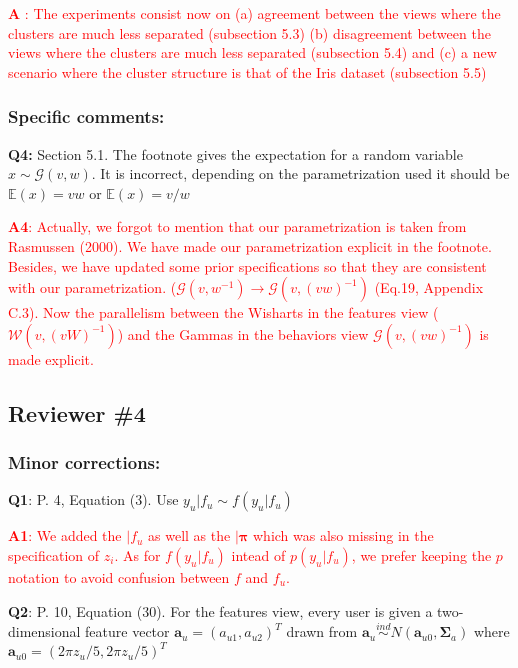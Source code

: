 \documentclass[]{article}
\newcommand\done[1]{\textcolor{red}{#1}}
\begin{document}
	\done{
		\textbf{A} : The experiments consist now on (a) agreement between the views where the clusters are much less separated (subsection 5.3) (b) disagreement between the views where the clusters are much less separated (subsection 5.4) and (c) a  new scenario where the cluster structure is that of the Iris dataset (subsection 5.5)
	}
	
	\vspace{3mm}
	
	
	\subsubsection*{Specific comments:}
	\textbf{Q4:} Section 5.1. The footnote gives the expectation for a random variable $x \sim \mathcal{G}(v, w)$. It is incorrect, depending on the parametrization used it should be $\mathbb{E}(x) = vw$ or $\mathbb{E}(x) = v/w$
	
	\done{
		\textbf{A4}:
		Actually, we forgot to mention that our parametrization is taken from Rasmussen (2000). We have made our parametrization explicit in the footnote. Besides, we have updated some prior specifications so that they are consistent with our parametrization. ($\mathcal{G}(v, w^{-1}) \rightarrow \mathcal{G}(v, (vw)^{-1})$ (Eq.19, Appendix C.3). Now the parallelism between the Wisharts in the features view ($\mathcal{W}(v, (vW)^{-1})$) and the Gammas in the behaviors view $\mathcal{G}(v, (vw)^{-1})$ is made explicit.
	}
	
	\subsection*{Reviewer \#4}
	\subsubsection*{Minor corrections:}
	\textbf{Q1}: P. 4, Equation (3). Use $y_u|f_u \sim f(y_u|f_u)$
	
	\done{
		\textbf{A1}: We added the $| f_u$ as well as the $| \boldsymbol{\pi}$ which was also missing in the specification of $z_i$. As for $f(y_u|f_u)$ intead of $p(y_u|f_u)$, we prefer keeping the $p$ notation to avoid confusion between $f$ and $f_u$.
	}
	
	\vspace{3mm}
	\textbf{Q2}: P. 10, Equation (30). For the features view, every user is given a two-dimensional feature vector $\mathbf{a}_u=(a_{u1},a_{u2})^T$ drawn from $\mathbf{a}_u \overset{ind}{\sim} N(\mathbf{a}_{u0}, \boldsymbol{\Sigma}_a)$ where $\mathbf{a}_{u0}=(2\pi z_u/5,2\pi z_u/5)^T$
	
\end{document}
